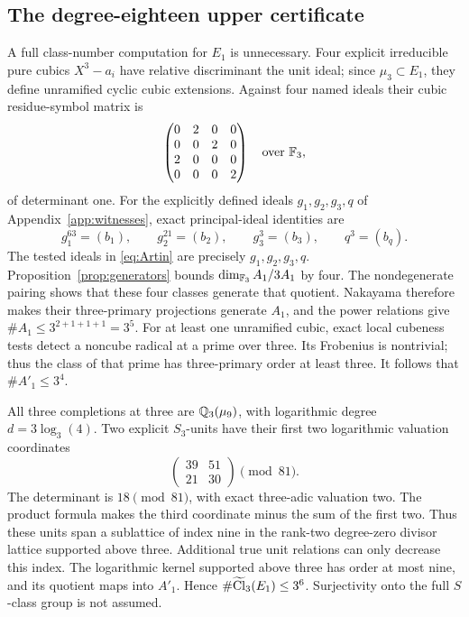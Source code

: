\documentclass[11pt]{article}
\theoremstyle{remark}\newtheorem{remark}[theorem]{Remark}
\begin{document}
\subsection{The degree-eighteen upper certificate}
A full class-number computation for $E_1$ is unnecessary.
Four explicit irreducible pure cubics $X^3-a_i$ have relative discriminant the unit ideal; since $\mu_3\subset E_1$, they define unramified cyclic cubic extensions.
Against four named ideals their cubic residue-symbol matrix is
\begin{equation}
 \begin{pmatrix}0&2&0&0\\0&0&2&0\\2&0&0&0\\0&0&0&2\end{pmatrix}
 \quad\text{over }\mathbb F_3,
 \label{eq:Artin}
\end{equation}
of determinant one.
For the explicitly defined ideals $g_1,g_2,g_3,q$ of Appendix~\ref{app:witnesses}, exact principal-ideal identities are
\begin{equation}
 g_1^{63}=(b_1),\qquad g_2^{21}=(b_2),\qquad
 g_3^3=(b_3),\qquad q^3=(b_q).
 \label{eq:idealrelations}
\end{equation}
The tested ideals in \eqref{eq:Artin} are precisely $g_1,g_2,g_3,q$.
Proposition~\ref{prop:generators} bounds $\dim_{\mathbb F_3}A_1/3A_1$ by four.
The nondegenerate pairing shows that these four classes generate that quotient.
Nakayama therefore makes their three-primary projections generate $A_1$, and the power relations give $\#A_1\leq3^{2+1+1+1}=3^5$.
For at least one unramified cubic, exact local cubeness tests detect a noncube radical at a prime over three.
Its Frobenius is nontrivial; thus the class of that prime has three-primary order at least three.
It follows that $\#A'_1\leq3^4$.

All three completions at three are $\mathbb Q_3(\mu_9)$, with logarithmic degree $d=3\log_3(4)$.
Two explicit $S_3$-units have their first two logarithmic valuation coordinates
\begin{equation}
 \begin{pmatrix}39&51\\21&30\end{pmatrix}\pmod{81}.
 \label{eq:logminor}
\end{equation}
The determinant is $18\pmod{81}$, with exact three-adic valuation two.
The product formula makes the third coordinate minus the sum of the first two.
Thus these units span a sublattice of index nine in the rank-two degree-zero divisor lattice supported above three.
Additional true unit relations can only decrease this index.
The logarithmic kernel supported above three has order at most nine, and its quotient maps into $A'_1$.
Hence $\#\widetilde{\operatorname{Cl}}_3(E_1)\leq3^6$.
Surjectivity onto the full $S$-class group is not assumed.
\end{document}
